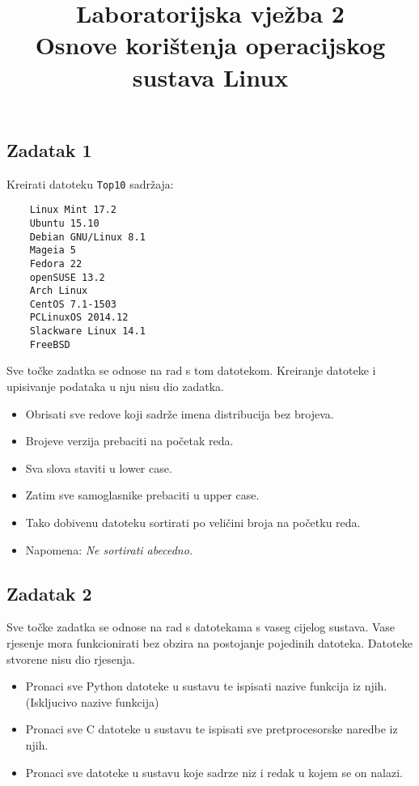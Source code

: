 \documentclass[12pt,a4paper]{article}
\newcommand{\shell}[1]{\texttt{#1}}
\begin{document}
	\title{Laboratorijska vježba 2\\{\small Osnove korištenja operacijskog sustava Linux}\vspace{-2em}}
	\maketitle
	\subsection*{Zadatak 1}
	Kreirati datoteku \shell{Top10} sadržaja:
	\begin{verbatim}
	Linux Mint 17.2
	Ubuntu 15.10
	Debian GNU/Linux 8.1
	Mageia 5
	Fedora 22
	openSUSE 13.2
	Arch Linux
	CentOS 7.1-1503
	PCLinuxOS 2014.12
	Slackware Linux 14.1
	FreeBSD
	\end{verbatim}
	Sve točke zadatka se odnose na rad s tom datotekom. Kreiranje datoteke i upisivanje podataka u nju nisu dio zadatka.
	\begin{itemize}
		\item Obrisati sve redove koji sadrže imena distribucija bez brojeva.
		\item Brojeve verzija prebaciti na početak reda.
		\item Sva slova staviti u lower case.
		\item Zatim sve samoglasnike prebaciti u upper case.
		\item Tako dobivenu datoteku sortirati po veličini broja na početku reda.
		\item[] Napomena: \textit{Ne sortirati abecedno.}
	\end{itemize}
  
	\subsection*{Zadatak 2}
	Sve točke zadatka se odnose na rad s datotekama s vaseg cijelog sustava. Vase rjesenje mora funkcionirati bez obzira na postojanje pojedinih datoteka. Datoteke stvorene nisu dio rjesenja.
	\begin{itemize}
    \item Pronaci sve Python datoteke u sustavu te ispisati nazive funkcija iz njih. (Iskljucivo nazive funkcija)
		\item Pronaci sve C datoteke u sustavu te ispisati sve pretprocesorske naredbe iz njih.
    \item Pronaci sve datoteke u sustavu koje sadrze niz  i redak u kojem se on nalazi.
	\end{itemize}
\end{document}
